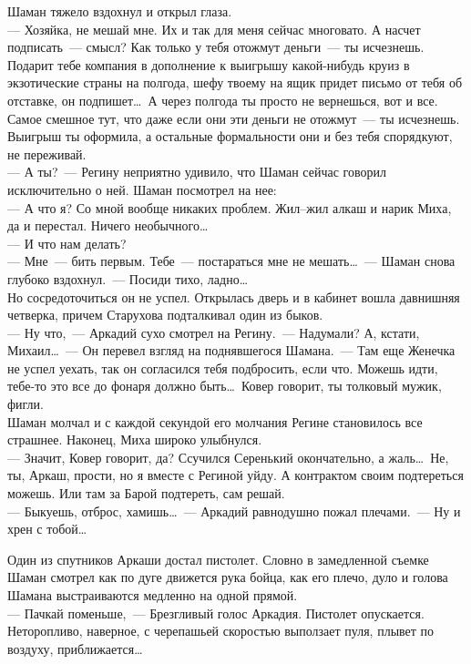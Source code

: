 Шаман тяжело вздохнул и открыл глаза.\\
--- Хозяйка, не мешай мне. Их и так для меня сейчас многовато. 
А насчет подписать~--- смысл? Как только у тебя отожмут деньги~--- ты исчезнешь. Подарит тебе 
компания в дополнение к выигрышу какой-нибудь круиз в экзотические страны на полгода, 
шефу твоему на ящик придет письмо от тебя об отставке, он подпишет\ldots\ А 
через полгода ты просто не вернешься, вот и все. Самое смешное тут, что даже если они 
эти деньги не отожмут~--- ты исчезнешь. Выигрыш ты оформила, а остальные 
формальности они и без тебя спорядкуют, не переживай.\\
--- А ты?~--- Регину неприятно удивило, что Шаман сейчас говорил исключительно о 
ней. Шаман посмотрел на нее:\\
--- А что я? Со мной вообще никаких проблем. Жил--жил алкаш и нарик Миха, да и 
перестал. Ничего необычного\ldots\\
--- И что нам делать?\\
--- Мне~--- бить первым. Тебе~--- постараться мне не мешать\ldots~--- Шаман снова 
глубоко вздохнул.~--- Посиди тихо, ладно\ldots\\

Но сосредоточиться он не успел. Открылась дверь и в кабинет вошла давнишняя 
четверка, причем Старухова подталкивал один из быков.\\
--- Ну что,~--- Аркадий сухо смотрел на Регину.~--- Надумали? А, кстати, 
Михаил\ldots~--- Он перевел взгляд на поднявшегося Шамана.~--- Там еще Женечка не успел уехать, так 
он согласился тебя подбросить, если что. Можешь идти, тебе-то это все до фонаря 
должно быть\ldots\ Ковер говорит, ты толковый мужик, фигли.\\

Шаман молчал и с каждой секундой его молчания Регине становилось все страшнее. 
Наконец, Миха широко улыбнулся.\\
--- Значит, Ковер говорит, да? Ссучился Серенький окончательно, а жаль\ldots\ Не, 
ты, Аркаш, прости, но я вместе с Региной уйду. А контрактом своим подтереться 
можешь. Или там за Барой подтереть, сам решай.\\
--- Быкуешь, отброс, хамишь\ldots~--- Аркадий равнодушно пожал плечами.~--- Ну и 
хрен с тобой\ldots

Один из спутников Аркаши достал пистолет. Словно в замедленной съемке Шаман 
смотрел как по дуге движется рука бойца, как его плечо, дуло и голова Шамана 
выстраиваются медленно на одной прямой.\\
--- Пачкай поменьше,~--- Брезгливый голос Аркадия. Пистолет опускается. 
Неторопливо, наверное, с черепашьей скоростью выползает пуля, плывет по воздуху, 
приближается\ldots

